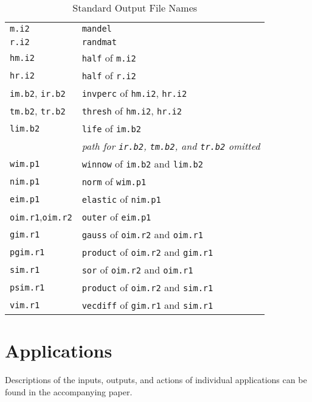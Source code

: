 \begin{table}
\begin{small}\begin{center}\begin{tabular}{ll}
{\tt{m.i2}}		& {\tt{mandel}}						\\
{\tt{r.i2}}		& {\tt{randmat}}					\\
{\tt{hm.i2}}		& {\tt{half}} of {\tt{m.i2}}				\\
{\tt{hr.i2}}		& {\tt{half}} of {\tt{r.i2}}				\\
{\tt{im.b2}}, {\tt{ir.b2}}	& {\tt{invperc}} of {\tt{hm.i2}}, {\tt{hr.i2}}	\\
{\tt{tm.b2}}, {\tt{tr.b2}}	& {\tt{thresh}} of {\tt{hm.i2}}, {\tt{hr.i2}}	\\
{\tt{lim.b2}}		& {\tt{life}} of {\tt{im.b2}}				\\
			& {\em{path for {\tt{ir.b2}}, {\tt{tm.b2}},
			  and {\tt{tr.b2}} omitted}\/}				\\
{\tt{wim.p1}}		& {\tt{winnow}} of {\tt{im.b2}} and {\tt{lim.b2}}	\\
{\tt{nim.p1}}		& {\tt{norm}} of {\tt{wim.p1}}				\\
{\tt{eim.p1}}		& {\tt{elastic}} of {\tt{nim.p1}}			\\
{\tt{oim.r1}},{\tt{oim.r2}}	& {\tt{outer}} of {\tt{eim.p1}}			\\
{\tt{gim.r1}}		& {\tt{gauss}} of {\tt{oim.r2}} and {\tt{oim.r1}}	\\
{\tt{pgim.r1}}		& {\tt{product}} of {\tt{oim.r2}} and {\tt{gim.r1}}	\\
{\tt{sim.r1}}		& {\tt{sor}} of {\tt{oim.r2}} and {\tt{oim.r1}}		\\
{\tt{psim.r1}}		& {\tt{product}} of {\tt{oim.r2}} and {\tt{sim.r1}}	\\
{\tt{vim.r1}}		& {\tt{vecdiff}} of {\tt{gim.r1}} and {\tt{sim.r1}}
\end{tabular}\end{center}\end{small}
\caption{Standard Output File Names\label{t:file-names}}
\end{table}

\section{Applications\label{s:app}}

Descriptions of the inputs, outputs, and actions of individual applications
can be found in the accompanying paper.

